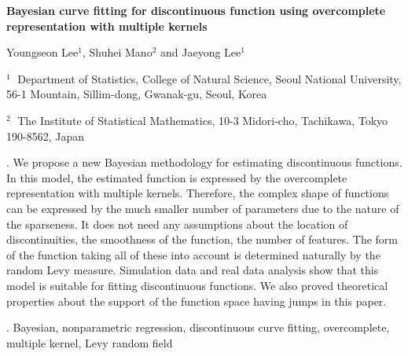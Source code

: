 \documentclass[12pt]{article}
\begin{document}
\begin{flushleft}


{\LARGE\bf Bayesian curve fitting for discontinuous function using overcomplete representation with multiple kernels}


\vspace{1.0cm}

Youngseon Lee$^1$, Shuhei Mano$^2$ and Jaeyong Lee$^1$

\begin{description}

\item $^1 \;$ Department of Statistics, College of Natural Science, Seoul National University, 56-1 Mountain, Sillim-dong, Gwanak-gu, Seoul, Korea

\item $^2 \;$ The Institute of Statistical Mathematics, 
10-3 Midori-cho, Tachikawa, Tokyo 190-8562, Japan

\end{description}

\end{flushleft}


\vspace{0.75cm}

. We propose a new Bayesian methodology for estimating discontinuous functions. In this model, the estimated function is expressed by the overcomplete representation with multiple kernels. Therefore, the complex shape of functions can be expressed by the much smaller number of parameters due to the nature of the sparseness. It does not need any assumptions about the location of discontinuities, the smoothness of the function, the number of features. The form of the function taking all of these into account is determined naturally by the random Levy measure. Simulation data and real data analysis show that this model is suitable for fitting discontinuous functions. We also proved theoretical properties about the support of the function space having jumps in this paper.

\vskip 2mm

.
Bayesian, nonparametric regression, discontinuous curve fitting, overcomplete, multiple kernel, Levy random field
\end{document}
